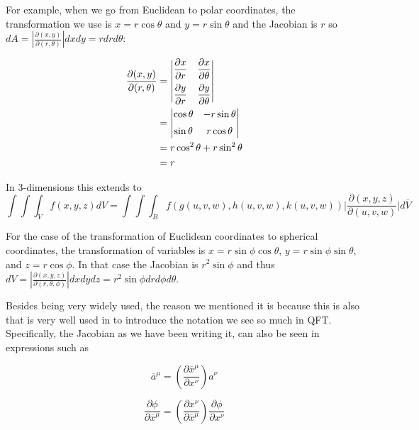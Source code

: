 For example, when we go from Euclidean to polar coordinates, the transformation we use is $x = r\cos\theta$
and $y = r\sin\theta$ and the Jacobian is $r$ so
$dA = \left| \frac{\partial (x, y)}{\partial (r, \theta)} \right| dx dy = r dr d\theta$:

\begin{align*}
\frac{\partial (x, y)}{\partial (r, \theta)} &= 
\begin{vmatrix}
    \dfrac{ \partial x }{ \partial r } & \dfrac{ \partial x }{ \partial \theta } \\ \addlinespace
    \dfrac{ \partial y }{ \partial r } & \dfrac{ \partial y }{ \partial \theta }
\end{vmatrix} \\
& = \begin{vmatrix}
    \cos\theta & -r\sin\theta \\ \addlinespace
    \sin\theta & r\cos\theta
\end{vmatrix} \\
&= r \cos^2 \theta + r \sin^2 \theta \\
&= r
\end{align*}



In 3-dimensions this extends to
$$
\int \int \int_{V} f(x,y,z) dV
= \int \int \int_{B} f\left( g(u,v,w), h(u,v,w), k(u,v,w) \right) \Biggl| \frac{ \partial (x,y,z) }{ \partial (u,v,w) } \Biggl| d\overline{V}
$$

For the case of the transformation of Euclidean coordinates to spherical coordinates, the transformation of variables is
$x = r \sin\phi \cos\theta $, $y = r \sin\phi \sin\theta$, and $z = r\cos\phi$.
In that case the Jacobian is $r^2 \sin\phi$ and thus
$dV = \left| \frac{\partial (x, y, z)}{\partial (r, \theta, \phi)} \right| dx dy dz = r^2 \sin\phi dr d\phi d\theta$.


Besides being very widely used, the reason we mentioned it is because this is also that is very well used in
\cite{gifted-qft} to introduce the notation we see so much in QFT.
Specifically, the Jacobian as we have been writing it, can also be seen in expressions such as

$$
\overline{a}^{\mu} = \left( \frac{\partial \overline{x}^\mu}{\partial x^\nu} \right) a^\nu
$$

$$
\frac{\partial \phi}{\partial \overline{x}^\mu} =
    \left( \frac{\partial x^\nu}{\partial \overline{x}^\mu} \right) \frac{\partial \phi}{\partial x^\nu}
$$


